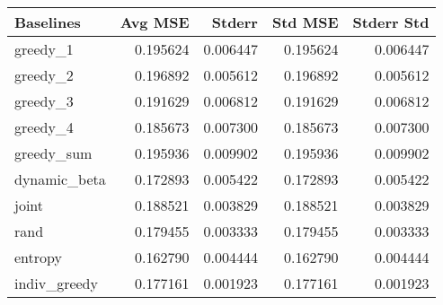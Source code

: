 \begin{tabular}{lrrrr}
\toprule
    Baselines &   Avg MSE &    Stderr &   Std MSE &  Stderr Std \\
\midrule
     greedy\_1 &  0.195624 &  0.006447 &  0.195624 &    0.006447 \\
     greedy\_2 &  0.196892 &  0.005612 &  0.196892 &    0.005612 \\
     greedy\_3 &  0.191629 &  0.006812 &  0.191629 &    0.006812 \\
     greedy\_4 &  0.185673 &  0.007300 &  0.185673 &    0.007300 \\
   greedy\_sum &  0.195936 &  0.009902 &  0.195936 &    0.009902 \\
 dynamic\_beta &  0.172893 &  0.005422 &  0.172893 &    0.005422 \\
        joint &  0.188521 &  0.003829 &  0.188521 &    0.003829 \\
         rand &  0.179455 &  0.003333 &  0.179455 &    0.003333 \\
      entropy &  0.162790 &  0.004444 &  0.162790 &    0.004444 \\
 indiv\_greedy &  0.177161 &  0.001923 &  0.177161 &    0.001923 \\
\bottomrule
\end{tabular}
